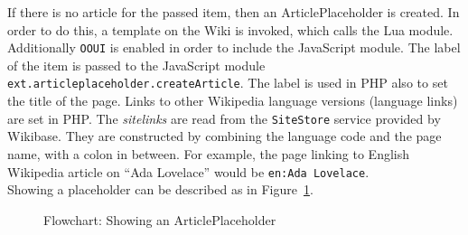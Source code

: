 If there is no article for the passed item, then an ArticlePlaceholder is created. In order to do this, a template on the Wiki is invoked, which calls the Lua module. Additionally \texttt{\justify OOUI} is enabled in order to include the JavaScript module. The label of the item is passed to the JavaScript module \texttt{\justify ext.articleplaceholder.createArticle}. The label is used in PHP also to set the title of the page. Links to other Wikipedia language versions (language links) are set in PHP. The \textit{sitelinks} are read from the \texttt{\justify SiteStore} service provided by Wikibase. They are constructed by combining the language code and the page name, with a colon in between. For example, the page linking to English Wikipedia article on ``Ada Lovelace'' would be \texttt{\justify en:Ada Lovelace}.\\
Showing a placeholder can be described as in Figure~\ref{fig:showpl}. 
\begin{figure}[H]
	\centering
	
	\caption{Flowchart: Showing an ArticlePlaceholder}
	\label{fig:showpl}
\end{figure}
